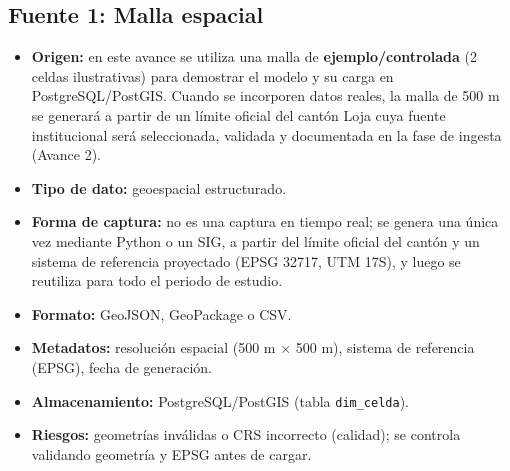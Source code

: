 \documentclass[11pt,a4paper]{article}
\begin{document}
\subsection{Fuente 1: Malla espacial}
\begin{itemize}
    \item \textbf{Origen:} en este avance se utiliza una malla de \textbf{ejemplo/controlada} (2 celdas ilustrativas) para demostrar el modelo y su carga en PostgreSQL/PostGIS. Cuando se incorporen datos reales, la malla de 500 m se generar\'a a partir de un l\'imite oficial del cant\'on Loja cuya fuente institucional ser\'a seleccionada, validada y documentada en la fase de ingesta (Avance 2).
    \item \textbf{Tipo de dato:} geoespacial estructurado.
    \item \textbf{Forma de captura:} no es una captura en tiempo real; se genera una \'unica vez mediante Python o un SIG, a partir del l\'imite oficial del cant\'on y un sistema de referencia proyectado (EPSG 32717, UTM 17S), y luego se reutiliza para todo el periodo de estudio.
    \item \textbf{Formato:} GeoJSON, GeoPackage o CSV.
    \item \textbf{Metadatos:} resoluci\'on espacial (500 m $\times$ 500 m), sistema de referencia (EPSG), fecha de generaci\'on.
    \item \textbf{Almacenamiento:} PostgreSQL/PostGIS (tabla \texttt{dim\_celda}).
    \item \textbf{Riesgos:} geometr\'ias inv\'alidas o CRS incorrecto (calidad); se controla validando geometr\'ia y EPSG antes de cargar.
\end{itemize}
\end{document}
